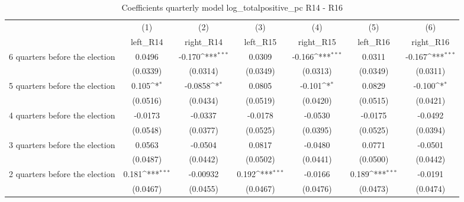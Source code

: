 \begin{table}[htbp]\centering
\def\sym#1{\ifmmode^{#1}\else\(^{#1}\)\fi}
\caption{Coefficients quarterly model log\_totalpositive\_pc R14 - R16}
\begin{tabular}{l*{6}{c}}
\hline\hline
                    &\multicolumn{1}{c}{(1)}&\multicolumn{1}{c}{(2)}&\multicolumn{1}{c}{(3)}&\multicolumn{1}{c}{(4)}&\multicolumn{1}{c}{(5)}&\multicolumn{1}{c}{(6)}\\
                    &\multicolumn{1}{c}{left\_R14}&\multicolumn{1}{c}{right\_R14}&\multicolumn{1}{c}{left\_R15}&\multicolumn{1}{c}{right\_R15}&\multicolumn{1}{c}{left\_R16}&\multicolumn{1}{c}{right\_R16}\\
\hline
 6 quarters before the election&      0.0496         &      -0.170\sym{***}&      0.0309         &      -0.166\sym{***}&      0.0311         &      -0.167\sym{***}\\
                    &    (0.0339)         &    (0.0314)         &    (0.0349)         &    (0.0313)         &    (0.0349)         &    (0.0311)         \\
[1em]
 5 quarters before the election&       0.105\sym{*}  &     -0.0858\sym{*}  &      0.0805         &      -0.101\sym{*}  &      0.0829         &      -0.100\sym{*}  \\
                    &    (0.0516)         &    (0.0434)         &    (0.0519)         &    (0.0420)         &    (0.0515)         &    (0.0421)         \\
[1em]
 4 quarters before the election&     -0.0173         &     -0.0337         &     -0.0178         &     -0.0530         &     -0.0175         &     -0.0492         \\
                    &    (0.0548)         &    (0.0377)         &    (0.0525)         &    (0.0395)         &    (0.0525)         &    (0.0394)         \\
[1em]
 3 quarters before the election&      0.0563         &     -0.0504         &      0.0817         &     -0.0480         &      0.0771         &     -0.0501         \\
                    &    (0.0487)         &    (0.0442)         &    (0.0502)         &    (0.0441)         &    (0.0500)         &    (0.0442)         \\
[1em]
 2 quarters before the election&       0.181\sym{***}&    -0.00932         &       0.192\sym{***}&     -0.0166         &       0.189\sym{***}&     -0.0191         \\
                    &    (0.0467)         &    (0.0455)         &    (0.0467)         &    (0.0476)         &    (0.0473)         &    (0.0474)         \\

\end{tabular}
\end{table}
